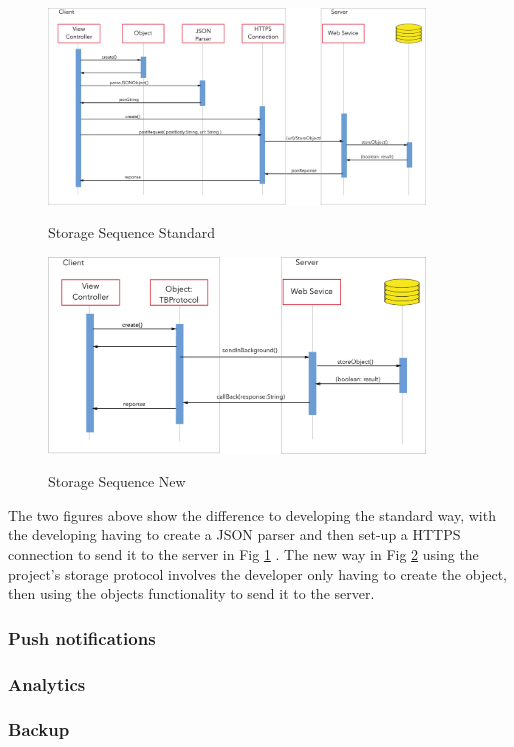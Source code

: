 \begin{figure}[!h]
    \caption{Storage Sequence Standard}
    \centering
    \includegraphics[width=100mm]{images/services/storage_sequence_current}
    \label{fig:storage_old}
\end{figure}


\begin{figure}[!h]
    \caption{Storage Sequence New}
    \centering
    \includegraphics[width=100mm]{images/services/storage_sequence}
    \label{fig:storage_new}
\end{figure}

The two figures above show the difference to developing the standard way, with the developing having to create a JSON parser and then set-up a HTTPS connection to send it to the server in Fig \ref{fig:storage_old} . The new way in Fig \ref{fig:storage_new} using the project's storage protocol involves the developer only having to create the object, then using the objects functionality to send it to the server.

\subsubsection{Push notifications}


\subsubsection{Analytics}


\subsubsection{Backup}


